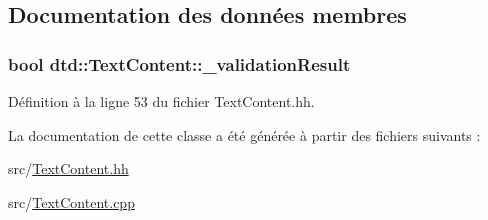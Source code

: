 \subsection{Documentation des données membres}
\hypertarget{classdtd_1_1_text_content_a8aed746e0439c19af52a4b844a05e1b4}{
\subsubsection[{\_\-validationResult}]{\setlength{\rightskip}{0pt plus 5cm}bool {\bf dtd::TextContent::\_\-validationResult}}}
\label{classdtd_1_1_text_content_a8aed746e0439c19af52a4b844a05e1b4}


Définition à la ligne 53 du fichier TextContent.hh.



La documentation de cette classe a été générée à partir des fichiers suivants :\begin{DoxyCompactItemize}
\item 
src/\hyperlink{_text_content_8hh}{TextContent.hh}\item 
src/\hyperlink{_text_content_8cpp}{TextContent.cpp}\end{DoxyCompactItemize}

